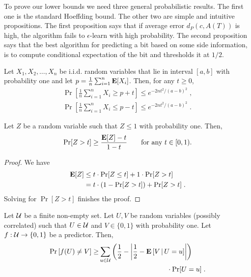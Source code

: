 To prove our lower bounds we need three general probabilistic results. The first
one is the standard Hoeffding bound. The other two are simple and intuitive
propositions. The first proposition says that if average error $d_P(c,A(T))$ is
high, the algorithm fails to $\epsilon$-learn with high probability. The second
proposition says that the best algorithm for predicting a bit based on some side
information, is to compute conditional expectation of the bit and thresholds it
at $1/2$.

\begin{theorem}
Let $X_1, X_2, \dots, X_n$ be i.i.d. random variables that lie in interval
$[a,b]$ with probability one and let $p=\frac{1}{n}\sum_{i=1}^n \operatorname{\mathbf{E}}[X_i]$.
Then, for any $t \ge 0$,
\begin{align*}
\Pr \left[{\frac {1}{n}} \sum_{i=1}^n X_i \ge p + t \right] \le e^{ - 2n t^2/(a-b)^2} \; , \\
\Pr \left[{\frac {1}{n}} \sum_{i=1}^n X_i \le p - t \right] \le e^{ - 2n t^2/(a-b)^2}  \; .
\end{align*}
\end{theorem}

\begin{proposition}
\label{proposition:error-probability-vs-expected-error}
Let $Z$ be a random variable such that $Z \le 1$ with probability one.
Then,
$$
\Pr[Z > t] \ge \frac{\operatorname{\mathbf{E}}[Z] - t}{1 - t} \qquad \text{for any $t \in [0, 1)$.}
$$
\end{proposition}

\begin{proof}
We have
\begin{align*}
\operatorname{\mathbf{E}}[Z]
& \le t \cdot \Pr[Z \le t] + 1 \cdot \Pr[Z > t] \\
& = t \cdot (1 - \Pr[Z > t]) + \Pr[Z > t] \; .
\end{align*}
Solving for $\Pr[Z > t]$ finishes the proof.
\end{proof}

\begin{proposition}
\label{proposition:single-bit}
Let $\mathcal{U}$ be a finite non-empty set. Let $U,V$ be random variables (possibly
correlated) such that $U \in \mathcal{U}$ and $V \in \{0,1\}$ with probability one. Let
$f:\mathcal{U} \to \{0,1\}$ be a predictor. Then,
\begin{align*}
\Pr\left[ f(U) \neq V \right]
\ge &\sum_{u \in \U} \left( \frac{1}{2} - \left| \frac{1}{2} -  \Exp \left[V \, \middle| \, U = u\right] \right| \right) 
\\&\hspace{3.5cm}\cdot \Pr[U = u] \; .
\end{align*}
\end{proposition}

